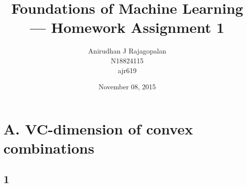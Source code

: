 \documentclass{article}
\begin{document}
\title{Foundations of Machine Learning --- Homework Assignment 1}
\date{November 08, 2015}
\author{Anirudhan J Rajagopalan\\ N18824115\\ ajr619}

\maketitle

\newpage

\section*{A. VC-dimension of convex combinations}
\subsection*{1}
\end{document}
